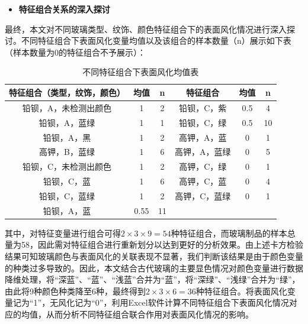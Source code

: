 \documentclass[withoutpreface,bwprint]{cumcmthesis} %
\begin{document}
\begin{itemize}
	\item \textbf{特征组合关系的深入探讨}
\end{itemize}

最终，本文对不同玻璃类型、纹饰、颜色特征组合下的表面风化情况进行深入探讨。不同特征组合下表面风化变量均值以及该组合的样本数量（n）展示如下表（样本数量为0的特征组合不予展示）：

\begin{table}[H]
\centering
\caption{不同特征组合下表面风化均值表}
\begin{tabular}{cccccc}
\toprule[1.5pt]
特征组合（类型，纹饰，颜色） & 均值   & n & 特征组合       & 均值                   & n                 \\ \hline
铅钡，A，未检测出颜色    & 1    & 2    & 铅钡，C，紫               & 0.5                  & 4                    \\
铅钡，A，蓝绿        & 1    & 1    & 铅钡，C，绿               & 0.5                  & 10                   \\
铅钡，A，黑         & 1    & 2    & 高钾，A，蓝               & 0                    & 1                    \\
高钾，B，蓝绿        & 1    & 6    & 高钾，A，蓝绿              & 0                    & 5                    \\
铅钡，C，未检测出颜色    & 1    & 2    & 高钾，C，绿               & 0                    & 1                    \\
铅钡，C，蓝         & 1    & 6    & 高钾，C，蓝               & 0                    & 4                    \\
铅钡，C，蓝绿        & 1    & 2    & 高钾，C，蓝绿              & 0                    & 1                    \\
铅钡，A，蓝         & 0.55 & 11   & \multicolumn{1}{l}{} & \multicolumn{1}{l}{} & \multicolumn{1}{l}{} \\ \bottomrule[1.5pt]
\end{tabular}
\end{table}

其中，对特征变量进行组合可得$2 \times 3 \times 9 = 54$种特征组合，而玻璃制品的样本总量为58，因此需对特征组合进行重新划分以达到更好的分析效果。由上述卡方检验结果可知玻璃颜色与表面风化的关联表现不显著，我们判断该结果是由于颜色变量的种类过多导致的。因此，本文结合古代玻璃的主要显色情况对颜色变量进行数据降维处理，将“深蓝”、“蓝”、“浅蓝”合并为“蓝”，将“深绿”、“浅绿”合并为“绿”，由此将9种颜色种类降至6种，最终得到$2 \times 3 \times 6 = 36$种特征组合。将表面风化变量记为“1”，无风化记为“0”，利用Excel软件计算不同特征组合下表面风化情况对应的均值，从而分析不同特征组合联合作用对表面风化情况的影响。
\end{document}
